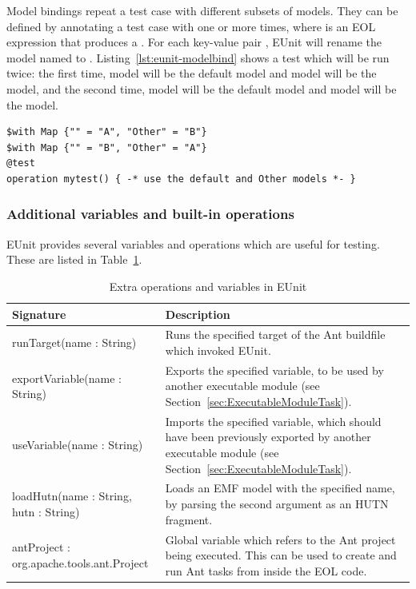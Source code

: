 Model bindings repeat a test case with different subsets of models. They can be defined by annotating a test case with  one or more times, where  is an EOL expression that produces a . For each key-value pair , EUnit will rename the model named  to . Listing~\ref{lst:eunit-modelbind} shows a test which will be run twice: the first time, model  will be the default model and model  will be the  model, and the second time, model  will be the default model and model  will be the  model.

\begin{lstlisting}[language=EOL,caption=Example of a model binding,label=lst:eunit-modelbind,columns=fixed,float]
$with Map {"" = "A", "Other" = "B"}
$with Map {"" = "B", "Other" = "A"}
@test
operation mytest() { -* use the default and Other models *- }
\end{lstlisting}

\subsubsection{Additional variables and built-in operations}

EUnit provides several variables and operations which are useful for testing. These are listed in Table~\ref{tab:eunit-operations}.

\begin{table}
  \begin{tabular}{|p{6cm}|p{6.5cm}|}
    \hline \textbf{Signature} & \textbf{Description}  \\\hline

    runTarget(name : String)      & Runs the specified target of the Ant buildfile which invoked EUnit. \\\hline

    exportVariable(name : String) & Exports the specified variable, to be used by another executable module (see Section~\ref{sec:ExecutableModuleTask}). \\\hline

    useVariable(name : String) & Imports the specified variable, which should have been previously exported by another executable module (see Section~\ref{sec:ExecutableModuleTask}). \\\hline

    loadHutn(name : String, hutn : String) & Loads an EMF model with the specified name, by parsing the second argument as an HUTN~\cite{HUTN} fragment. \\\hline

    antProject : org.apache.tools.ant.Project & Global variable which refers to the Ant project being executed. This can be used to create and run Ant tasks from inside the EOL code. \\\hline
  \end{tabular}
  \caption{Extra operations and variables in EUnit}
  \label{tab:eunit-operations}
\end{table}

